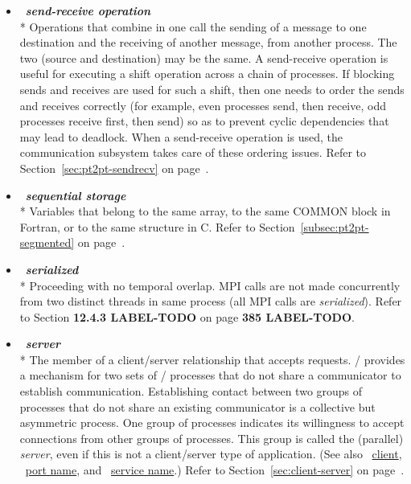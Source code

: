 \begin{itemize}
\label{glossary:send-receive_operation}
\item  ~\hypertarget{glossary:send-receive_operation}{\emph{\textbf{send-receive operation}}} \\*
Operations that combine in one call the sending of a
message to one destination and the receiving of another message, from
another process.  The two (source and destination) may be the same.
A send-receive operation is
useful for executing a shift operation across a chain of
processes.  If blocking sends and receives are used for such a shift,
then one needs to order the sends and receives correctly (for
example, even processes
send, then receive, odd processes receive first, then send) so as to prevent
cyclic dependencies that may lead to deadlock.  When a send-receive
operation is used, the communication subsystem takes care of
these ordering issues.
Refer to Section~\ref{sec:pt2pt-sendrecv} on page~\pageref{sec:pt2pt-sendrecv}.

\label{glossary:sequential_storage}
\item  ~\hypertarget{glossary:sequential_storage}{\emph{\textbf{sequential storage}}} \\*
Variables that belong to the same array,
to the same {\sf COMMON} block in Fortran, or to the same structure in C.
Refer to Section~\ref{subsec:pt2pt-segmented} on page~\pageref{subsec:pt2pt-segmented}.

\label{glossary:serialized}
\item  ~\hypertarget{glossary:serialized}{\emph{\textbf{serialized}}} \\*
Proceeding with no temporal overlap.
MPI calls are not made concurrently from two distinct threads in same process (all MPI calls are \emph{serialized}).
Refer to Section {\bf 12.4.3 LABEL-TODO} on page {\bf 385 LABEL-TODO}.

\label{glossary:server}
\item  ~\hypertarget{glossary:server}{\emph{\textbf{server}}} \\*
The member of a client/server relationship that accepts requests.
 \MPI/ provides a mechanism for two sets of \MPI/  processes that do not share a communicator
to establish communication.
Establishing contact between two groups of processes that do not share an
existing communicator is a collective but asymmetric process.  One group of
processes indicates its willingness to accept connections from other groups of
processes.  This group is called the (parallel) \emph{server}, even if this
is not a client/server type of application.  
(See also ~\hyperlink{glossary:client}{client}, ~\hyperlink{glossary:port_name}{port name},
and ~\hyperlink{glossary:service_name}{service name}.) 
Refer to Section~\ref{sec:client-server} on page~\pageref{sec:client-server}.


\end{itemize}
